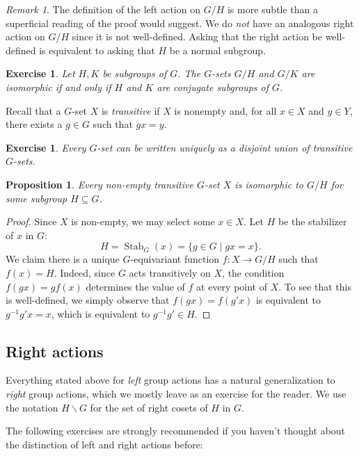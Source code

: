\documentclass[12pt]{article}
\theoremstyle{plain}
\newtheorem{proposition}[theorem]{Proposition}
\newtheorem{exercise}[theorem]{Exercise}
\theoremstyle{definition}
\theoremstyle{remark}
\newtheorem{remark}[theorem]{Remark}
\numberwithin{equation}{section}
\begin{document}
\begin{remark}
The definition of the left action on $G/H$ is more subtle than a
superficial reading of the proof would suggest.
We do \emph{not} have an analogous right action on $G/H$
since it is not well-defined.  Asking that the right action be
well-defined is equivalent to asking that $H$ be a normal subgroup.
\end{remark}

\begin{exercise}
Let $H,K$ be subgroups of $G$.
The $G$-sets $G/H$ and $G/K$ are isomorphic if and only if
$H$ and $K$ are conjugate subgroups of $G$.
\end{exercise}

Recall that a $G$-set $X$ is \emph{transitive} if $X$ is nonempty
and, for all $x \in X$ and
$y \in Y$, there exists a $g \in G$ such that $gx=y$.

\begin{exercise}
Every $G$-set can be written uniquely as a disjoint union of
transitive $G$-sets.
\end{exercise}

\begin{proposition}
Every non-empty transitive $G$-set $X$ is isomorphic to $G/H$
for some subgroup $H \subseteq G$.
\end{proposition}

\begin{proof}
Since $X$ is non-empty, we may select some $x \in X$.
Let $H$ be the stabilizer of $x$ in $G$:
\[
H = \operatorname{Stab}_G(x) = \{ g \in G \mid gx=x \}.
\]
We claim there is a unique $G$-equivariant function
$f : X \to G/H$ such that $f(x)=H$.
Indeed, since $G$ acts transitively on $X$,
the condition $f(gx)=gf(x)$ determines the value of $f$ at every point
of $X$.  To see that this is well-defined, we simply observe that
$f(gx)=f(g'x)$ is equivalent to $g^{-1}g'x=x$, which is equivalent to
$g^{-1}g' \in H$.
\end{proof}

\subsection{Right actions}

Everything stated above for \emph{left} group actions has a natural
generalization to \emph{right} group actions, which we mostly leave as
an exercise for the reader.
We use the notation $H \backslash G$ for the set of right cosets of $H$
in $G$.

The following exercises are strongly recommended if you haven't
thought about the distinction of left and right actions before:
\end{document}
